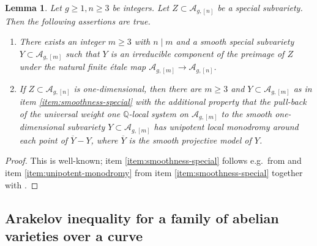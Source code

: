 \documentclass[a4paper,11pt,reqno]{amsart}
\numberwithin{equation}{section}
\theoremstyle{plain}
\newtheorem{lemma}[theorem]{Lemma}
\theoremstyle{definition}
\newcommand{\Q}{\mathbb Q}
\newcommand{\ol}[1]{{\overline{#1}}}
\newcommand{\ca}[1]{{\mathcal{#1}}}
\begin{document}
\begin{lemma} \label{lemma:moonen-deligne}
    Let $g \geq 1, n \geq 3$ be integers. Let $Z \subset \ca A_{g,[n]}$ be a special subvariety. Then the following assertions are true. 
    \begin{enumerate}
        \item \label{item:smoothness-special}There exists an integer $m \geq 3$ with $n \mid m$ and a smooth special subvariety $Y \subset \ca A_{g,[m]}$ such that $Y$ is an irreducible component of the preimage of $Z$ under the natural finite \'etale map $\ca A_{g,[m]} \to \ca A_{g,[n]}$. 
        \item \label{item:unipotent-monodromy}If $Z \subset \ca A_{g,[n]}$ is one-dimensional, then there are $m \geq 3$ and $Y \subset \ca A_{g,[m]}$ as in item \eqref{item:smoothness-special} with the additional property that the pull-back of the universal weight one $\Q$-local system on $\ca A_{g,[m]}$ to the smooth one-dimensional subvariety $Y \subset \ca A_{g,[m]}$ has unipotent local monodromy around each point of $\ol{Y} - Y$, where $\ol{Y}$ is the smooth projective model of $Y$.  
    \end{enumerate}
\end{lemma}
\begin{proof}
This is well-known; item \eqref{item:smoothness-special} follows e.g.\ from \cite[Lemma 3.3]{moonen-linearity-I} and item \eqref{item:unipotent-monodromy} from item \eqref{item:smoothness-special} together with \cite[Proposition 1.6(2)]{yau-zhang-toroidal}.  
\end{proof}

\subsection{Arakelov inequality for a family of abelian varieties over a curve}
\end{document}

